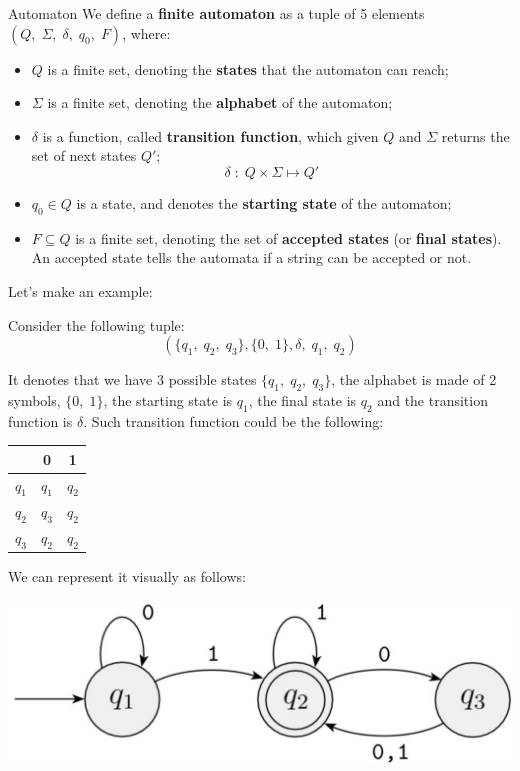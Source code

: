 \begin{definition}{Automaton}
    We define a \textbf{finite automaton} as a tuple of 5 elements $(Q, \; \Sigma, \; \delta, \; q_{0}, \; F)$, where:
    \begin{itemize}
        \item $Q$ is a finite set, denoting the \textbf{states} that the automaton can reach;
        \item $\Sigma$ is a finite set, denoting the \textbf{alphabet} of the automaton;
        \item $\delta$ is a function, called \textbf{transition function}, which given $Q$ and $\Sigma$ returns the set of next states $Q'$;
        \[ \delta \; : \; Q \times \Sigma \longmapsto Q'  \]
        \item $q_{0} \in Q$ is a state, and denotes the \textbf{starting state} of the automaton;
        \item $F \subseteq Q$ is a finite set, denoting the set of \textbf{accepted states} (or \textbf{final states}). An accepted state tells the automata if a string can be accepted or not.
    \end{itemize}
\end{definition}

\noindent Let's make an example:

\begin{example}
    Consider the following tuple: 
    \[ (\{ q_{1}, \; q_{2}, \; q_{3} \}, \{ 0, \; 1 \}, \delta, \; q_{1}, \; q_{2}) \]
    
    \noindent It denotes that we have 3 possible states $\{ q_{1}, \; q_{2}, \; q_{3} \}$, the alphabet is made of 2 symbols, $\{ 0, \; 1 \}$, the starting state is $q_{1}$, the final state is $q_{2}$ and the transition function is $\delta$. Such transition function could be the following: 
    \begin{center}
        \begin{tabular}{c|c c}
            & 0 & 1 \\
            \hline
            $q_{1}$ & $q_{1}$ & $q_{2}$ \\
            $q_{2}$ & $q_{3}$ & $q_{2}$ \\
            $q_{3}$ & $q_{2}$ & $q_{2}$
        \end{tabular}
    \end{center}
    
    \noindent We can represent it visually as follows:
    \begin{center}
        \includegraphics[scale = 0.25]{imgs/001.png}
    \end{center}
\end{example}